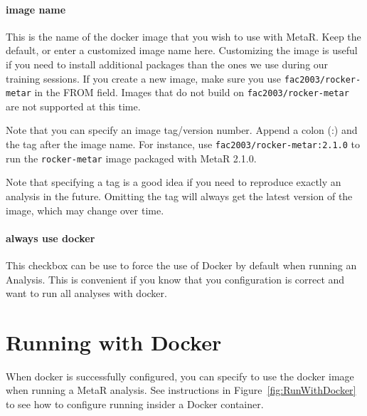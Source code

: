 \paragraph{image name}
This is the name of the docker image that you wish to use with MetaR. Keep the default, or enter a customized image name here. Customizing the image is useful if you need to install additional packages than the ones we use during our training sessions. If you create a new image, make sure you use \texttt{fac2003/rocker-metar} in the FROM field. Images that do not build on \texttt{fac2003/rocker-metar} are not supported at this time. 

\begin{remark}
Note that you can specify an image tag/version number. Append a colon (:) and the tag after the image name. For instance, use \texttt{fac2003/rocker-metar:2.1.0} to run the \texttt{rocker-metar} image packaged with MetaR 2.1.0.  
\end{remark}

\begin{remark}
Note that specifying a tag is a good idea if you need to reproduce exactly an analysis in the future. Omitting the tag will always get the latest version of the image, which may change over time.  
\end{remark}

\paragraph{always use docker}
This checkbox can be use to force the use of Docker by default when running an Analysis. This is convenient if you know that you configuration is correct and want to run all analyses with docker. 

\section{Running with Docker}
When docker is successfully configured, you can specify to use the docker image when running a MetaR analysis. See instructions in Figure~\ref{fig:RunWithDocker} to see how to configure running insider a Docker container.

